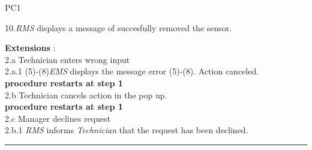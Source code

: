 \begin{lyxlist}{PC1}
{10.\emph{RMS} displays a message of succesfully removed the sensor.\\
\item [\textbf{Extensions}]:\\
2.a Technician enters wrong input\\
\hspace*{0.5cm} 2.a.1 (5)-(8)\emph{EMS} displays the message error (5)-(8).
Action canceled.\\
\hspace*{0.5cm} \textbf{procedure restarts at step 1}\\
2.b Technician cancels action in the pop up.\\
\hspace*{0.5cm} \textbf{procedure restarts at step 1}\\
2.c Manager declines request\\
\hspace*{0.5cm} 2.b.1 \emph{RMS} informs \emph{Technician} that the request
has been declined.\\
}
\end{lyxlist}
\hrule
\vspace{0.5cm}

\break


